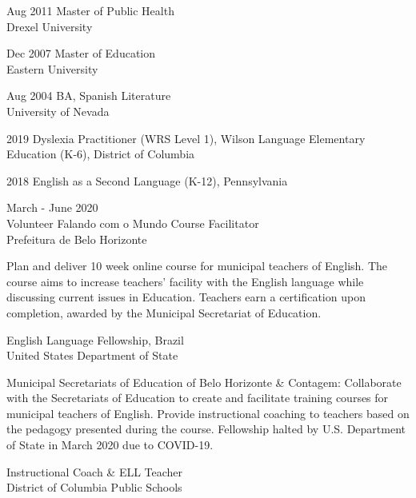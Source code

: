 \documentclass[]{scrartcl}
\begin{document}
\begin{cleanCV}
  \vspace{-0.50em}
  
\WorkExperience
{Aug 2011}
{Master of Public Health}
{\\Drexel University}

\WorkExperience
{Dec 2007}
{Master of Education}
{\\Eastern University}

\WorkExperience
{Aug 2004}
{BA, Spanish Literature}
{\\University of Nevada}

\vspace{-1.0em}


\WorkExperience
{2019}
{}
{Dyslexia Practitioner (WRS Level 1), Wilson Language Elementary \\
 Education (K-6), District of Columbia}

\WorkExperience
{2018}
{}{English as a Second Language (K-12), Pennsylvania}
\vspace{-1.0em}
    
\vspace{0.50em}

\WorkExperience
{March - June 2020 \\ Volunteer}
{Falando com o Mundo Course Facilitator}
{\\Prefeitura de Belo Horizonte}

\JobDesc{}
{Plan and deliver 10 week online course for municipal teachers of English. The course aims to increase teachers' facility with the English language while discussing current issues in Education. Teachers earn a certification upon completion, awarded by the Municipal Secretariat of Education.}

{English Language Fellowship, Brazil}
{\\United States Department of State}

\JobDesc
{Municipal Secretariats of Education of Belo Horizonte \& Contagem: }
{Collaborate with the Secretariats of Education to create and facilitate training courses for municipal teachers of English. Provide instructional coaching to teachers based on the pedagogy presented during the course. Fellowship halted by U.S. Department of State in March 2020 due to COVID-19.}

{Instructional Coach \& ELL Teacher}
{\\District of Columbia Public Schools}


\end{cleanCV}
\end{document}
